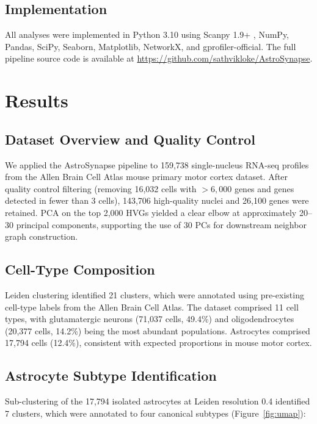 \documentclass[sigconf]{acmart}
\begin{document}
\subsection{Implementation}
All analyses were implemented in Python 3.10 using Scanpy 1.9+ \cite{wolf2018scanpy}, NumPy, Pandas, SciPy, Seaborn, Matplotlib, NetworkX, and gprofiler-official. The full pipeline source code is available at \url{https://github.com/sathvikloke/AstroSynapse}.

\section{Results}

\subsection{Dataset Overview and Quality Control}
We applied the AstroSynapse pipeline to 159,738 single-nucleus RNA-seq profiles from the Allen Brain Cell Atlas mouse primary motor cortex dataset. After quality control filtering (removing 16,032 cells with $>6,000$ genes and genes detected in fewer than 3 cells), 143,706 high-quality nuclei and 26,100 genes were retained. PCA on the top 2,000 HVGs yielded a clear elbow at approximately 20--30 principal components, supporting the use of 30 PCs for downstream neighbor graph construction.

\subsection{Cell-Type Composition}
Leiden clustering identified 21 clusters, which were annotated using pre-existing cell-type labels from the Allen Brain Cell Atlas. The dataset comprised 11 cell types, with glutamatergic neurons (71,037 cells, 49.4\%) and oligodendrocytes (20,377 cells, 14.2\%) being the most abundant populations. Astrocytes comprised 17,794 cells (12.4\%), consistent with expected proportions in mouse motor cortex.

\subsection{Astrocyte Subtype Identification}
Sub-clustering of the 17,794 isolated astrocytes at Leiden resolution 0.4 identified 7 clusters, which were annotated to four canonical subtypes (Figure~\ref{fig:umap}):
\end{document}
